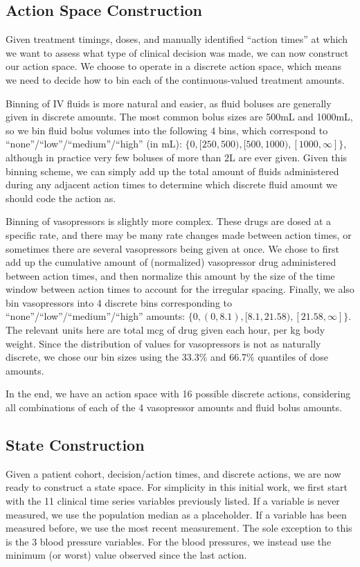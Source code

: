 \documentclass{article}
\begin{document}
\subsection{Action Space Construction}

Given treatment timings, doses, and manually identified ``action times'' at which we want to assess what type of clinical decision was made, we can now construct our action space. We choose to operate in a discrete action space, which means we need to decide how to bin each of the continuous-valued treatment amounts.  

Binning of IV fluids is more natural and easier, as fluid boluses are generally given in discrete amounts. The most common bolus sizes are 500mL and 1000mL, so we bin fluid bolus volumes into the following 4 bins, which correspond to ``none''/``low''/``medium''/``high'' (in mL): $\{0, [250,500), [500,1000), [1000,\infty]\}$, although in practice very few boluses of more than 2L are ever given. Given this binning scheme, we can simply add up the total amount of fluids administered during any adjacent action times to determine which discrete fluid amount we should code the action as.

Binning of vasopressors is slightly more complex. These drugs are dosed at a specific rate, and there may be many rate changes made between action times, or sometimes there are several vasopressors being given at once. We chose to first add up the cumulative amount of (normalized) vasopressor drug administered between action times, and then normalize this amount by the size of the time window between action times to account for the irregular spacing. Finally, we also bin vasopressors into 4 discrete bins corresponding to ``none''/``low''/``medium''/``high'' amounts: $\{0, (0,8.1), [8.1, 21.58), [21.58, \infty]\}$. The relevant units here are total mcg of drug given each hour, per kg body weight. Since the distribution of values for vasopressors is not as naturally discrete, we chose our bin sizes using the 33.3\% and 66.7\% quantiles of dose amounts.

In the end, we have an action space with 16 possible discrete actions, considering all combinations of each of the 4 vasopressor amounts and fluid bolus amounts.

\subsection{State Construction}

Given a patient cohort, decision/action times, and discrete actions, we are now ready to construct a state space. For simplicity in this initial work, we first start with the 11 clinical time series variables previously listed. If a variable is never measured, we use the population median as a placeholder. If a variable has been measured before, we use the most recent measurement. The sole exception to this is the 3 blood pressure variables. For the blood pressures, we instead use the minimum (or worst) value observed since the last action.
\end{document}
